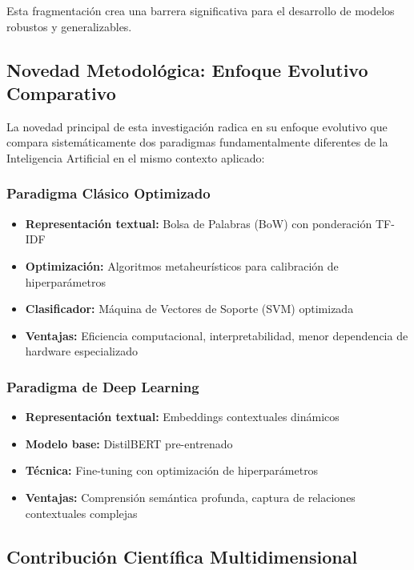Esta fragmentación crea una barrera significativa para el desarrollo de modelos robustos y generalizables.

\subsection{Novedad Metodológica: Enfoque Evolutivo Comparativo}

La novedad principal de esta investigación radica en su enfoque evolutivo que compara sistemáticamente dos paradigmas fundamentalmente diferentes de la Inteligencia Artificial en el mismo contexto aplicado:

\subsubsection{Paradigma Clásico Optimizado}
\begin{itemize}
    \item \textbf{Representación textual:} Bolsa de Palabras (BoW) con ponderación TF-IDF
    \item \textbf{Optimización:} Algoritmos metaheurísticos para calibración de hiperparámetros
    \item \textbf{Clasificador:} Máquina de Vectores de Soporte (SVM) optimizada
    \item \textbf{Ventajas:} Eficiencia computacional, interpretabilidad, menor dependencia de hardware especializado
\end{itemize}

\subsubsection{Paradigma de Deep Learning}
\begin{itemize}
    \item \textbf{Representación textual:} Embeddings contextuales dinámicos
    \item \textbf{Modelo base:} DistilBERT pre-entrenado \cite{sanh2019distilbert}
    \item \textbf{Técnica:} Fine-tuning con optimización de hiperparámetros
    \item \textbf{Ventajas:} Comprensión semántica profunda, captura de relaciones contextuales complejas
\end{itemize}

\subsection{Contribución Científica Multidimensional}


